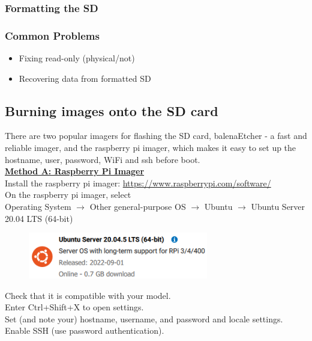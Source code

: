 \documentclass[a4paper, 10pt]{article}
\begin{document}
            \subsubsection{Formatting the SD}
            \subsubsection{Common Problems}
                \begin{itemize}
                    \item Fixing read-only (physical/not)
                    \item Recovering data from formatted SD
                \end{itemize}
        
        \subsection{Burning images onto the SD card}
            There are two popular imagers for flashing the SD card, balenaEtcher - a fast and reliable imager, and the raspberry pi imager, which makes it easy to set up the hostname, user, password, WiFi and ssh before boot. \\

        \underline{\textbf{Method A: Raspberry Pi Imager}}\\
        Install the raspberry pi imager: \url{https://www.raspberrypi.com/software/}\\
        
        On the raspberry pi imager, select\\
        Operating System $\rightarrow$ Other general-purpose OS  $\rightarrow$ Ubuntu $\rightarrow$ Ubuntu Server 20.04 LTS (64-bit) 
        
       \begin{figure}[h]
            \centering
            \includegraphics[width=0.7\textwidth]{media/ubuntu_rp_imager.png}
            \label{fig:rp-ubuntu-server}
        \end{figure}
    
        Check that it is compatible with your model. \\
        Enter Ctrl+Shift+X to open settings. \\
        Set (and note your) hostname, username, and password and locale settings. \\
        Enable SSH (use password authentication). \\
        
\end{document}
